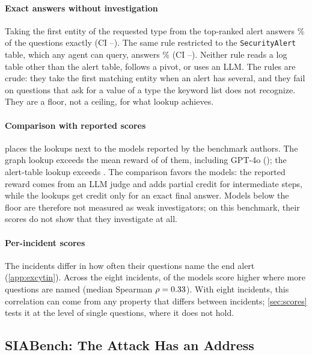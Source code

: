 \paragraph{Exact answers without investigation} Taking the first entity of the requested type from the top-ranked alert answers \oGraph\% of the questions exactly (CI \oGraphLo--\oGraphHi). The same rule restricted to the \texttt{SecurityAlert} table, which any agent can query, answers \oTable\% (CI \oTableLo--\oTableHi). Neither rule reads a log table other than the alert table, follows a pivot, or uses an LLM. The rules are crude: they take the first matching entity when an alert has several, and they fail on questions that ask for a value of a type the keyword list does not recognize. They are a floor, not a ceiling, for what lookup achieves.

\paragraph{Comparison with reported scores}  places the lookups next to the \oModels{} models reported by the benchmark authors. The graph lookup exceeds the mean reward of \oBelowGraph{} of them, including GPT-4o (\exGptFo); the alert-table lookup exceeds \oBelowTable. The comparison favors the models: the reported reward comes from an LLM judge and adds partial credit for intermediate steps, while the lookups get credit only for an exact final answer. Models below the floor are therefore not measured as weak investigators; on this benchmark, their scores do not show that they investigate at all.

\paragraph{Per-incident scores} The incidents differ in how often their questions name the end alert (\cref{app:excytin}). Across the eight incidents, \oHPos{} of the \oModels{} models score higher where more questions are named (median Spearman $\rho = 0.33$). With eight incidents, this correlation can come from any property that differs between incidents; \cref{sec:scores} tests it at the level of single questions, where it does not hold.

\subsection{SIABench: The Attack Has an Address}
\label{sec:siabench}

